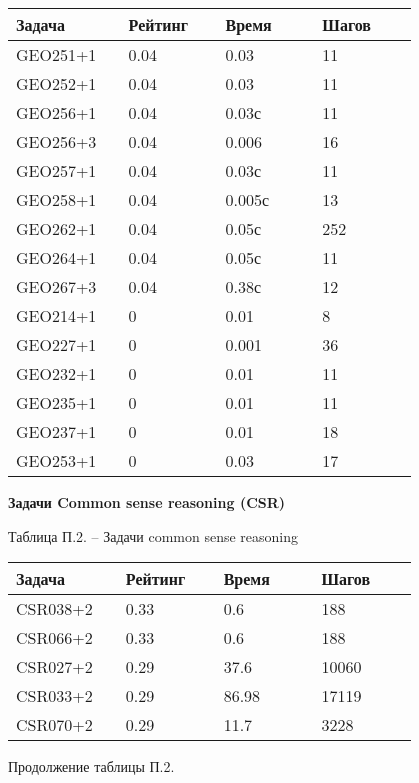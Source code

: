 \begin{longtable}[H]{|p{0.2\linewidth}|p{0.2\linewidth}|p{0.2\linewidth}|p{0.2\linewidth}|}
\hline
\textbf{Задача} & \textbf{Рейтинг} & \textbf{Время} & \textbf{Шагов} \\
\hline
GEO251+1 &  0.04 &  0.03 &  11 \\
\hline
GEO252+1 &  0.04 &  0.03 &  11 \\
\hline
GEO256+1 &  0.04 &  0.03с &  11 \\
\hline
GEO256+3 &  0.04 &  0.006 &  16 \\
\hline
GEO257+1 &  0.04 &  0.03с &  11 \\
\hline
GEO258+1 &  0.04 &  0.005с &  13 \\
\hline
GEO262+1 &  0.04 &  0.05с &  252 \\
\hline
GEO264+1 &  0.04 &  0.05с &  11 \\
\hline
GEO267+3 &  0.04 &  0.38с &  12 \\
\hline
GEO214+1 &  0 &  0.01 &  8 \\
\hline
GEO227+1 &  0 &  0.001 &  36 \\
\hline
GEO232+1 &  0 &  0.01 &  11 \\
\hline
GEO235+1 &  0 &  0.01 &  11 \\
\hline
GEO237+1 &  0 &  0.01 &  18 \\
\hline
GEO253+1 &  0 &  0.03 &  17 \\
\hline
\end{longtable}





\textbf{Задачи Common sense reasoning (CSR)}

\begin{center}
Таблица П.2. -- Задачи common sense reasoning
\end{center}

\begin{longtable}[H]{|p{0.2\linewidth}|p{0.2\linewidth}|p{0.2\linewidth}|p{0.2\linewidth}|}
\hline
\textbf{Задача} & \textbf{Рейтинг} & \textbf{Время} & \textbf{Шагов} \\
\hline
CSR038+2 &  0.33 &  0.6 &  188 \\
\hline
CSR066+2 &  0.33 &  0.6 &  188 \\
\hline
CSR027+2 &  0.29 &  37.6 &  10060 \\
\hline
CSR033+2 &  0.29 &  86.98 &  17119 \\
\hline
CSR070+2 &  0.29 &  11.7 &  3228 \\
\hline
\end{longtable}
\begin{center}
Продолжение таблицы П.2.
\end{center}

